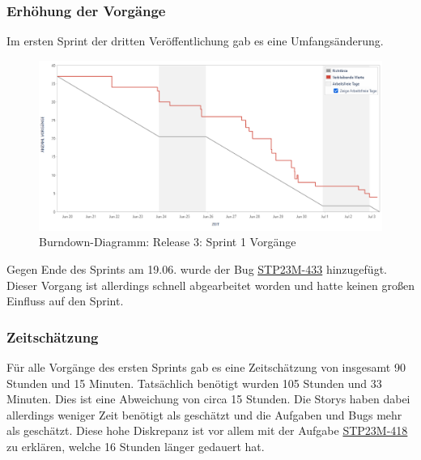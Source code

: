 \subsubsection{Erhöhung der Vorgänge}
Im ersten Sprint der dritten Veröffentlichung gab es eine Umfangsänderung.
\begin{figure}[H]
    \center
    \includegraphics[height=0.5\textwidth]{images/burndown/sprint1vorg.png}
    \caption{Burndown-Diagramm: Release 3: Sprint 1 Vorgänge}
    \label{fig: sprint1vorg}
\end{figure}
Gegen Ende des Sprints am 19.06. wurde der Bug \hyperlink{S433}{STP23M-433} hinzugefügt. Dieser Vorgang ist allerdings schnell abgearbeitet worden und hatte keinen großen Einfluss auf den Sprint.

\subsubsection{Zeitschätzung}
Für alle Vorgänge des ersten Sprints gab es eine Zeitschätzung von insgesamt 90 Stunden und 15 Minuten. Tatsächlich benötigt wurden 105 Stunden und 33 Minuten. Dies ist eine Abweichung von circa 15 Stunden. Die Storys haben dabei allerdings weniger Zeit benötigt als geschätzt und die Aufgaben und Bugs mehr als geschätzt. Diese hohe Diskrepanz ist vor allem mit der Aufgabe \hyperlink{S418}{STP23M-418} zu erklären, welche 16 Stunden länger gedauert hat. 